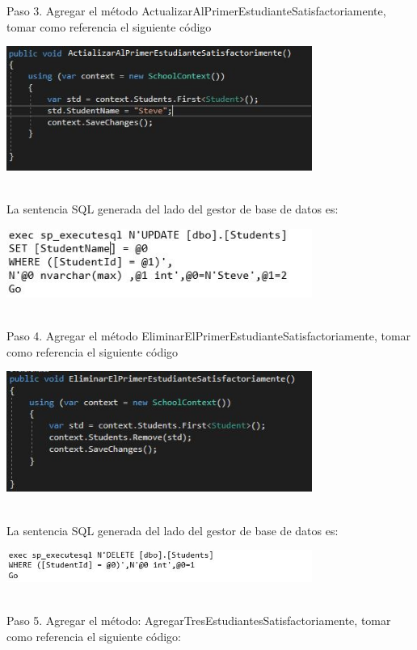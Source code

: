 Paso 3. Agregar el método ActualizarAlPrimerEstudianteSatisfactoriamente, tomar como referencia el siguiente código
\begin{center}
	\includegraphics[width=10cm]{./Imagenes/Captura13} 
	\end{center}
\textbf{}\\
La sentencia SQL generada del lado del gestor de base de datos es:
\begin{center}
	\includegraphics[width=10cm]{./Imagenes/U1-6} 
	\end{center}
\textbf{}\\
Paso 4. Agregar el método EliminarElPrimerEstudianteSatisfactoriamente, tomar como referencia el siguiente
código

\begin{center}
	\includegraphics[width=10cm]{./Imagenes/Captura10} 
	\end{center}
\textbf{}\\
La sentencia SQL generada del lado del gestor de base de datos es:
\begin{center}
	\includegraphics[width=10cm]{./Imagenes/U2-2} 
	\end{center}
\textbf{}\\
Paso 5. Agregar el método: AgregarTresEstudiantesSatisfactoriamente, tomar como referencia el siguiente código:

